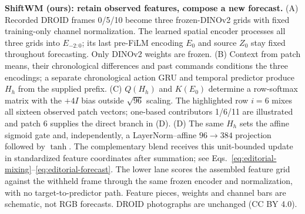 \textbf{ShiftWM (ours): retain observed features, compose a new forecast.} (A) Recorded DROID frames 0/5/10 become three frozen-DINOv2 grids with fixed training-only channel normalization. The learned spatial encoder processes all three grids into $E_{-2:0}$; its last pre-FiLM encoding $E_0$ and source $Z_0$ stay fixed throughout forecasting. Only DINOv2 weights are frozen. (B) Context from patch means, their chronological differences and past commands conditions the three encodings; a separate chronological action GRU and temporal predictor produce $H_h$ from the supplied prefix. (C) $Q(H_h)$ and $K(E_0)$ determine a row-softmax matrix with the $+4I$ bias outside $\sqrt{96}$ scaling. The highlighted row $i=6$ mixes all sixteen observed patch vectors; one-based contributors 1/6/11 are illustrated and patch 6 supplies the direct branch in (D). (D) The same $H_h$ sets the affine sigmoid gate and, independently, a LayerNorm--affine $96\!\to\!384$ projection followed by $\tanh$. The complementary blend receives this unit-bounded update in standardized feature coordinates after summation; see Eqs.~\eqref{eq:editorial-mixing}--\eqref{eq:editorial-forecast}. The lower lane scores the assembled feature grid against the withheld frame through the same frozen encoder and normalization, with no target-to-predictor path. Feature pieces, weights and channel bars are schematic, not RGB forecasts. DROID photographs are unchanged (CC BY 4.0).
